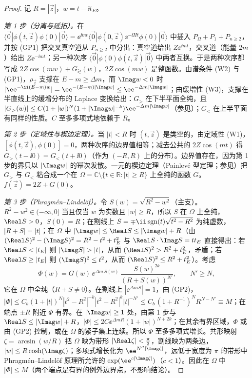\begin{proof}
记 $R=|\vec z|$，$w=t-\ii t_E$。

\emph{第 1 步（分离与延拓）。}在 $\langle\vec 0|\phi(t,\vec z)\phi(0)|\vec 0\rangle=\ee^{\ii mt}\langle\vec 0|\phi(0,\vec z)\ee^{-\ii Ht}\phi(0)|\vec 0\rangle$ 中插入 $P_\Omega+P_1+P_{n\ge2}$，并按 (GP1) 把交叉真空道从 $P_{n\ge2}$ 中分出：真空道给出 $Z\ee^{\ii mt}$，交叉道（能量 $2m$）给出 $Z\ee^{-\ii mt}$；另一种次序 $\langle\vec 0|\phi(0)\phi(t,\vec z)|\vec 0\rangle$ 中两者互换。于是两种次序都写成 $2Z\cos(mw)+G_\gtrless(w)$，$2Z\cos(mw)$ 是整函数。由谱条件 (W2) 与 (GP1)，$\rho_{\vec z}$ 支撑在 $E-m\ge\Delta m$，而 $\Imag w<0$ 时 $|\ee^{-\ii(E-m)w}|=\ee^{-(E-m)|\Imag w|}\le\ee^{-\Delta m|\Imag w|}$；由缓增性 (W3)，支撑在半直线上的缓增分布的 Laplace 变换给出：$G_>$ 在下半平面全纯，且 $|G_>(w)|\le C(1+|w|)^{N}(1+|\Imag w|^{-k})\ee^{-\Delta m|\Imag w|}$（参见\cite{Vladimirov2002,Streater:1989vi}）；$G_<$ 在上半平面有同样的性质。$C$ 至多多项式地依赖于 $R$。

\emph{第 2 步（定域性与楔边定理）。}当 $|t|<R$ 时 $(t,\vec z)$ 是类空的，由定域性 (W1)，$[\phi(t,\vec z),\phi(0)]=0$，两种次序的边界值相等；减去公共的 $2Z\cos(mt)$ 得 $G_>(t-\ii0)=G_<(t+\ii0)$（作为 $(-R,R)$ 上的分布）。边界值存在，因为第 1 步的界只以 $|\Imag w|$ 的幂次发散。一元的楔边定理（Painlevé 型定理；参见\cite{Streater:1989vi}）把 $G_>$ 与 $G_<$ 粘合成一个在
$\Omega=\mathbb C\setminus\{t\in\mathbb R:|t|\ge R\}$ 上全纯的函数 $G$。$f(\vec z)=2Z+G(0)$。

\emph{第 3 步（Phragmén--Lindelöf）。}令 $S(w)=\sqrt{R^2-w^2}$（主支）。$R^2-w^2\in(-\infty,0]$ 当且仅当 $w$ 为实数且 $|w|\ge R$，所以 $S$ 在 $\Omega$ 上全纯，$\Real S>0$，$S(0)=R$；在割线上 $S=\mp\ii\,{\rm sgn}(t)\sqrt{t^2-R^2}$ 为纯虚数，$|R+S|=|t|$；在 $\Omega$ 中 $|\Imag w|\le\Real S\le|\Imag w|+R$（由 $(\Real S)^2-(\Imag S)^2=R^2-t^2+t_E^2$ 与 $\Real S\cdot\Imag S=tt_E$ 直接得出：若 $\Real S<|t_E|$ 则 $|\Imag S|>|t|$，从而 $(\Real S)^2>R^2+t_E^2$，矛盾；若 $\Real S\ge|t_E|$ 则 $(\Imag S)^2\le t^2$，从而 $(\Real S)^2\le R^2+t_E^2$）。考虑
\[
\Phi(w)=G(w)\,\ee^{\Delta m\,S(w)}\,\frac{S(w)^{2k}}{(R+S(w))^{N'}},\qquad N'\ge N,
\]
它在 $\Omega$ 中全纯（$R+S\neq0$）。在割线上 $|\ee^{\Delta mS}|=1$，由 (GP2)，$|\Phi|\le C_b(1+|t|)^N|t^2-R^2|^{-k}|t^2-R^2|^k|t|^{-N'}\le C_b\,(1+R^{-1})^N R^{N-N'}\equiv M$；在端点 $\pm R$ 附近 $\Phi$ 有界。在 $|\Imag w|\ge1$ 处，由第 1 步与 $\Real S\le|\Imag w|+R$，$|\Phi|\le2C\ee^{\Delta mR}(1+|w|)^{N+2k}$；在其余有界区域，$\Phi$ 或由 (GP2) 控制，或在 $\Omega$ 的紧子集上连续。所以 $\Phi$ 至多多项式增长。共形映射 $\zeta=\arcsin(w/R)$ 把 $\Omega$ 映为带形 $|\Real\zeta|<\frac\pi2$，割线映为两条边，$|w|\le R\cosh(\Imag\zeta)$；多项式增长化为 $\ee^{N''|\Imag\zeta|}$，远低于宽度为 $\pi$ 的带形中 Phragmén--Lindelöf 原理所允许的 $\exp(\ee^{c|\Imag\zeta|})$（$c<1$）\cite{Titchmarsh1939}。因此在 $\Omega$ 中 $|\Phi|\le M$（两个端点是有界的例外边界点，不影响结论）。


\end{proof}
